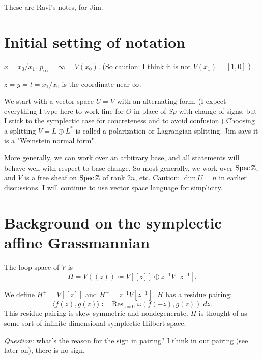 {\parskip=12pt %



  
  These are Ravi's notes, for Jim.


  \section{Initial setting of notation}

  $\boxed{x} = \boxed{x_0} / \boxed{x_1}$.  $\boxed{p_{\infty}} = \infty = V(x_0)$.
  (So caution: I think it is not $V(x_1)=[1,0]$.)

 $\boxed{z} = y= t = x_1/x_0$ is the coordinate near $\infty$.


We start with a vector space $\boxed{U=V}$ with an alternating form. 
(I expect everything I type here to work fine for $O$ in place of $Sp$  with change of signs, but I stick to the symplectic case for concreteness and to avoid confusion.) 
Choosing a splitting $V = L \oplus L^*$ is called a polarization or Lagrangian splitting. Jim says it is a "Weinstein normal form".

More generally, we can work over an arbitrary base, and all statements will behave well with respect to base change.
So most generally, we work over $\operatorname{Spec} \mathbb{Z}$, and $V$ is a free sheaf on $\operatorname{Spec} \mathbb{Z}$ of rank $\boxed{\boxed{2n}}$, etc.
Caution:  $\dim U=n$ in earlier discussions.
I will continue to use vector space language for simplicity.


\section{Background on the symplectic affine Grassmannian}



The loop space of $V$ is
$$\boxed{H} = \boxed{V((z))} \coloneq V[[z]] \oplus z^{-1} V[ z^{-1}].$$


We define
$\boxed{H^+} = V[[z]]$ and $\boxed{H^-} = z^{-1} V[ z^{-1}]$.
$H$ has a residue pairing:  
$$\boxed{\langle f(z), g(z) \rangle} \coloneq \operatorname{Res}_{z=0}  \omega(f(-z), g(z)) \; dz.$$
This residue pairing is skew-symmetric and nondegenerate.
$H$ is thought of as some sort of infinite-dimensional symplectic Hilbert space.


{\em Question:} what's the reason for the sign in pairing?  
I think in our pairing (see later on), there is no sign.


}
